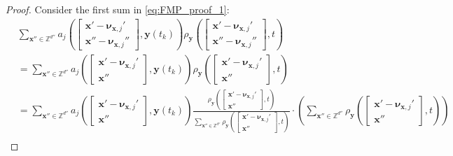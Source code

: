 \begin{proof}
    Consider the first sum in \eqref{eq:FMP_proof_1}:
    \begin{align*}
        &\sum_{\boldsymbol{x}'' \in \mathbb{Z}^{d''}} a_j \left( \begin{bmatrix} \boldsymbol{x}' - \boldsymbol{\nu}_{\boldsymbol{x}, j}' \\ \boldsymbol{x}'' - \boldsymbol{\nu}_{\boldsymbol{x}, j}'' \end{bmatrix}, \boldsymbol{y}(t_k) \right) \rho_{\boldsymbol{y}} \left( \begin{bmatrix} \boldsymbol{x}' - \boldsymbol{\nu}_{\boldsymbol{x}, j}' \\ \boldsymbol{x}'' - \boldsymbol{\nu}_{\boldsymbol{x}, j}'' \end{bmatrix}, t \right) \\
        &= \sum_{\boldsymbol{x}'' \in \mathbb{Z}^{d''}} a_j \left( \begin{bmatrix} \boldsymbol{x}' - \boldsymbol{\nu}_{\boldsymbol{x}, j}' \\ \boldsymbol{x}'' \end{bmatrix}, \boldsymbol{y}(t_k) \right) \rho_{\boldsymbol{y}} \left( \begin{bmatrix} \boldsymbol{x}' - \boldsymbol{\nu}_{\boldsymbol{x}, j}' \\ \boldsymbol{x}'' \end{bmatrix}, t \right) \\
        &= \sum_{\boldsymbol{x}'' \in \mathbb{Z}^{d''}} a_j \left( \begin{bmatrix} \boldsymbol{x}' - \boldsymbol{\nu}_{\boldsymbol{x}, j}' \\ \boldsymbol{x}'' \end{bmatrix}, \boldsymbol{y}(t_k) \right) \frac{ \rho_{\boldsymbol{y}} \left( \begin{bmatrix} \boldsymbol{x}' - \boldsymbol{\nu}_{\boldsymbol{x}, j}' \\ \boldsymbol{x}'' \end{bmatrix}, t \right) }{ \sum\limits_{\boldsymbol{x}'' \in \mathbb{Z}^{d''}} \rho_{\boldsymbol{y}}\left( \begin{bmatrix} \boldsymbol{x}' - \boldsymbol{\nu}_{\boldsymbol{x}, j}' \\ \boldsymbol{x}'' \end{bmatrix}, t \right) } \cdot \left( \sum_{\boldsymbol{x}'' \in \mathbb{Z}^{d''}} \rho_{\boldsymbol{y}} \left( \begin{bmatrix} \boldsymbol{x}' - \boldsymbol{\nu}_{\boldsymbol{x}, j}' \\ \boldsymbol{x}'' \end{bmatrix}, t \right) \right) \\

\end{align*}
\end{proof}
